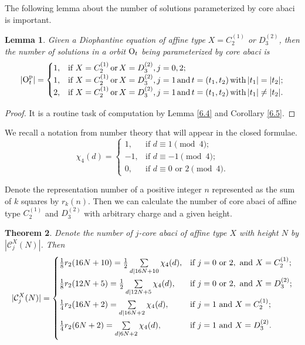\documentclass[11pt]{amsart}
\theoremstyle{plain}
\numberwithin{equation}{subsection}
\newtheorem{theorem}{Theorem}[section]
\newtheorem{lemma}[theorem]{Lemma}
\begin{document}
The following lemma about the number of solutions parameterized by core abaci is important.
\begin{lemma}\label{6.13}
Given a Diophantine equation of affine type $X=C_2^{(1)}$ or $D_3^{(2)}$, then the number of solutions in a orbit  ${\rm O}_t$
being parameterized by core abaci is
$$|{\rm O}_t^{\rm p}|=
\begin{cases}
  1, & \mbox{\rm if } X=C_2^{(1)} \,{\rm or}\, X=D_3^{(2)}, j=0, 2; \\
  1, & \mbox{\rm if } X=C_2^{(1)} \,{\rm or}\, X=D_3^{(2)}, j=1 \,{\rm and}\, t=(t_1, t_2) \,{\rm with}\, |t_1| = |t_2|; \\
  2, & \mbox{\rm if } X=C_2^{(1)} \,{\rm or}\, X=D_3^{(2)}, j=1 \,{\rm and}\, t=(t_1, t_2) \,{\rm with}\, |t_1|\neq |t_2|.
\end{cases}
$$
\end{lemma}

\begin{proof}
It is a routine task of computation by Lemma \ref{6.4} and Corollary \ref{6.5}.
\end{proof}

We recall a notation from number theory that will appear in the closed formulae.
$$\chi_4(d)=
\begin{cases}
  1, & \mbox{if } d\equiv 1 \pmod 4; \\
  -1, & \mbox{if } d\equiv -1 \pmod 4;  \\
  0, & \mbox{if } d\equiv 0\,\, \mbox{or } 2 \pmod 4.
\end{cases}
$$

Denote the representation number of a positive integer $n$ represented as the sum of $k$ squares by $r_k(n)$.
Then we can calculate the number of core abaci of affine type $C_2^{(1)}$ and $D_3^{(2)}$ with arbitrary charge and a given height.
\begin{theorem}\label{6.14}
Denote the number of $j$-core abaci of affine type $X$ with height $N$ by $|\mathcal{C}_j^X(N)|$. Then 
$$|\mathcal{C}_j^X(N)|=
\begin{cases}
  \smallskip
  \frac{1}{8}r_2(16N+10)=\frac{1}{2}\sum\limits_{d\mid 16N+10}\chi_4(d), & \mbox{\rm if } j=0 \mbox{ \rm or } 2, \mbox{ \rm and } X=C_2^{(1)}; \\
  \smallskip
  \frac{1}{8}r_2(12N+5)=\frac{1}{2}\sum\limits_{d\mid 12N+5}\chi_4(d), & \mbox{\rm if } j=0 \mbox{ \rm or } 2, \mbox{ \rm and } X=D_3^{(2)}; \\
  \smallskip
  \frac{1}{4}r_2(16N+2)=\sum\limits_{d\mid 16N+2}\chi_4(d), & \mbox{\rm if } j=1 \mbox{ \rm and } X=C_2^{(1)}; \\
  \smallskip
  \frac{1}{4}r_2(6N+2)=\sum\limits_{d\mid 6N+2}\chi_4(d), & \mbox{\rm if } j=1 \mbox{ \rm and } X=D_3^{(2)}.
\end{cases}
$$
\end{theorem}
\end{document}
